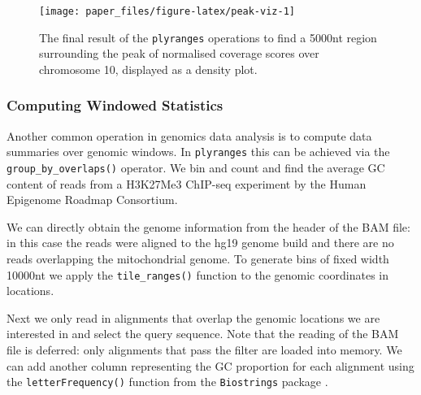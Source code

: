\documentclass[]{article}
\newenvironment{Shaded}{\begin{snugshade}}{\end{snugshade}}
\newcommand{\DataTypeTok}[1]{\textcolor[rgb]{0.13,0.29,0.53}{#1}}
\newcommand{\KeywordTok}[1]{\textcolor[rgb]{0.13,0.29,0.53}{\textbf{#1}}}
\newcommand{\NormalTok}[1]{#1}
\newcommand{\OperatorTok}[1]{\textcolor[rgb]{0.81,0.36,0.00}{\textbf{#1}}}
\newcommand{\StringTok}[1]{\textcolor[rgb]{0.31,0.60,0.02}{#1}}
\begin{document}
\begin{figure}

{\centering \texttt{[image: paper\_files/figure-latex/peak-viz-1]} 

}

\caption{The final result of the \texttt{plyranges} operations to find a 5000nt region surrounding the peak of normalised coverage scores over chromosome 10, displayed as a density plot.}\label{fig:peak-viz}
\end{figure}

\hypertarget{computing-windowed-statistics}{%
\subsubsection{Computing Windowed
Statistics}\label{computing-windowed-statistics}}

Another common operation in genomics data analysis is to compute data
summaries over genomic windows. In \texttt{plyranges} this can be
achieved via the \texttt{group\_by\_overlaps()} operator. We bin and
count and find the average GC content of reads from a H3K27Me3 ChIP-seq
experiment by the Human Epigenome Roadmap Consortium.

We can directly obtain the genome information from the header of the BAM
file: in this case the reads were aligned to the hg19 genome build and
there are no reads overlapping the mitochondrial genome. To generate
bins of fixed width 10000nt we apply the \texttt{tile\_ranges()}
function to the genomic coordinates in locations.

\begin{Shaded}
\end{Shaded}

Next we only read in alignments that overlap the genomic locations we
are interested in and select the query sequence. Note that the reading
of the BAM file is deferred: only alignments that pass the filter are
loaded into memory. We can add another column representing the GC
proportion for each alignment using the \texttt{letterFrequency()}
function from the \texttt{Biostrings} package \cite{R-biostrings}.
\end{document}
